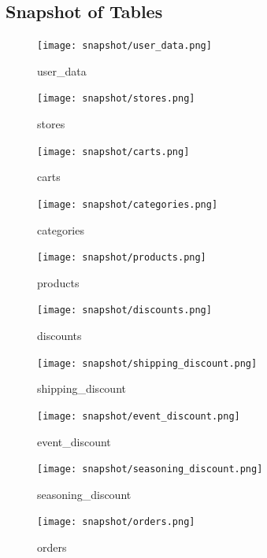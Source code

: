 \documentclass[a4paper, 12pt]{article}
\begin{document}
\newpage

\subsection{Snapshot of Tables}
\begin{figure}[hp]
    \centerline{\texttt{[image: snapshot/user\_data.png]}}
    \caption{user_data}
\end{figure}


\begin{figure}[hp]
    \centerline{\texttt{[image: snapshot/stores.png]}}
    \caption{stores}
\end{figure}

\begin{figure}[hp]
    \centerline{\texttt{[image: snapshot/carts.png]}}
    \caption{carts}
\end{figure}

\begin{figure}[hp]
    \centerline{\texttt{[image: snapshot/categories.png]}}
    \caption{categories}
\end{figure}

\begin{figure}[hp]
    \centerline{\texttt{[image: snapshot/products.png]}}
    \caption{products}
\end{figure}

\begin{figure}[hp]
    \centerline{\texttt{[image: snapshot/discounts.png]}}
    \caption{discounts}
\end{figure}

\begin{figure}[hp]
    \centerline{\texttt{[image: snapshot/shipping\_discount.png]}}
    \caption{shipping_discount}
\end{figure}

\begin{figure}[hp]
    \centerline{\texttt{[image: snapshot/event\_discount.png]}}
    \caption{event_discount}
\end{figure}

\begin{figure}[hp]
    \centerline{\texttt{[image: snapshot/seasoning\_discount.png]}}
    \caption{seasoning_discount}
\end{figure}

\begin{figure}[hp]
    \centerline{\texttt{[image: snapshot/orders.png]}}
    \caption{orders}
\end{figure}
\end{document}
